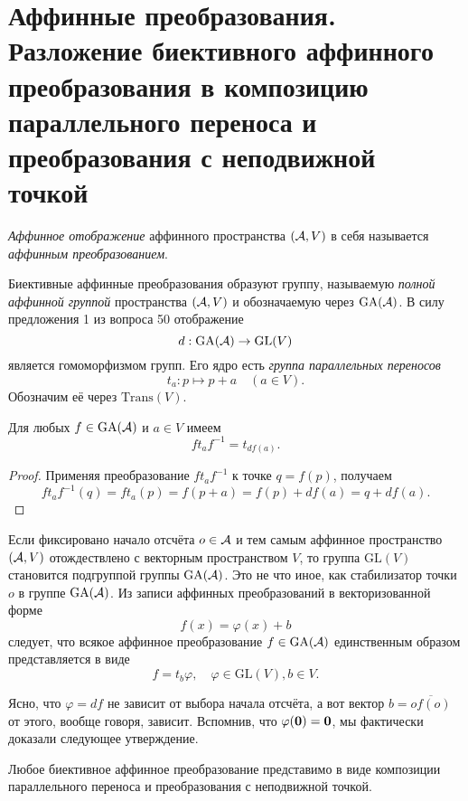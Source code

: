 \section{Аффинные преобразования. Разложение биективного аффинного преобразования в
композицию параллельного переноса и преобразования с неподвижной точкой}

\begin{definition}
    \textit{Аффинное отображение} аффинного пространства $(\mathcal{A}, V)$ в себя называется \textit{аффинным преобразованием}.
\end{definition}

Биективные аффинные преобразования образуют группу, называемую \textit{полной аффинной группой} пространства $(\mathcal{A}, V)$ и обозначаемую через $\mathrm{GA}(\mathcal{A})$. В силу предложения 1 из вопроса 50 отображение
\[
    d: \mathrm{GA}(\mathcal{A}) \to \mathrm{GL}(V)
\]
является гомоморфизмом групп. Его ядро есть \textit{группа параллельных переносов}
\[
    t_a: p \mapsto p + a\quad(a \in V).
\]
Обозначим её через $\mathrm{Trans}(V)$.

\begin{proposal}
    Для любых $f \in \mathrm{GA}(\mathcal{A})$ и $a \in V$ имеем
    \[
        ft_af^{-1} = t_{df(a)}.
    \]
\end{proposal}

\begin{proof}
    Применяя преобразование $ft_af^{-1}$ к точке $q = f(p)$, получаем
    \[
        ft_af^{-1}(q) = ft_a(p) = f(p + a) = f(p) + df(a) = q + df(a).
    \]
\end{proof}

Если фиксировано начало отсчёта $o \in \mathcal{A}$ и тем самым аффинное пространство $(\mathcal{A}, V)$ отождествлено с векторным пространством $V$, то группа $\mathrm{GL}(V)$ становится подгруппой группы $\mathrm{GA}(\mathcal{A})$. Это не что иное, как стабилизатор точки $o$ в группе $\mathrm{GA}(\mathcal{A})$. Из записи аффинных преобразований в векторизованной форме
\[
    f(x) = \varphi(x) + b
\]
следует, что всякое аффинное преобразование $f \in \mathrm{GA}(\mathcal{A})$ единственным образом представляется в виде
\[
    f = t_b\varphi,\quad \varphi \in \mathrm{GL}(V), b \in V.
\]

Ясно, что $\varphi = df$ не зависит от выбора начала отсчёта, а вот вектор $b = \overline{of(o)}$ от этого, вообще говоря, зависит. Вспомнив, что $\varphi(\boldsymbol{0}) = \boldsymbol{0}$, мы фактически доказали следующее утверждение.

\begin{theorem}
    Любое биективное аффинное преобразование представимо в виде композиции параллельного переноса и преобразования с неподвижной точкой.
\end{theorem}


